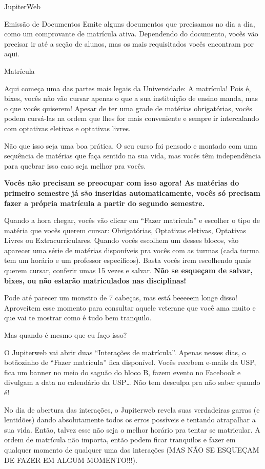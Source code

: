 \begin{secao}{JupiterWeb}
\begin{subsecao}{Emissão de Documentos}
Emite alguns documentos que precisamos no dia a dia, como um comprovante de
matrícula ativa. Dependendo do documento, vocês vão precisar ir até a seção de
alunos, mas os mais requisitados vocês encontram por aqui.

\end{subsecao}

\begin{subsecao}{Matrícula}

Aqui começa uma das partes mais legais da Universidade: A matrícula! Pois é,
bixes, vocês não vão cursar apenas o que a sua instituição de ensino manda, mas o
que vocês quiserem! Apesar de ter uma grade de matérias obrigatórias, vocês
podem cursá-las na ordem que lhes for mais conveniente e sempre ir intercalando
com optativas eletivas e optativas livres.

Não que isso seja uma boa prática. O seu curso foi pensado e montado com uma
sequência de matérias que faça sentido na sua vida, mas vocês têm independência
para quebrar isso caso seja melhor pra vocês.

\textbf{Vocês não precisam se preocupar com isso agora! As matérias do primeiro
semestre já são inseridas automaticamente, vocês só precisam fazer a própria
matrícula a partir do segundo semestre.}

Quando a hora chegar, vocês vão clicar em “Fazer matrícula” e escolher o tipo de
matéria que vocês querem cursar: Obrigatórias, Optativas eletivas, Optativas
Livres ou Extracurriculares. Quando vocês escolhem um desses blocos, vão
aparecer uma série de matérias disponíveis pra vocês com as turmas (cada turma
tem um horário e um professor específicos). Basta vocês irem escolhendo quais
querem cursar, conferir umas 15 vezes e salvar. \textbf{Não se esqueçam de salvar,
bixes, ou não estarão matriculados nas disciplinas!}

Pode até parecer um monstro de 7 cabeças, mas está beeeeem longe disso!
Aproveitem esse momento para consultar aquele veterane que você ama muito e que
vai te mostrar como é tudo bem tranquilo.

Mas quando é mesmo que eu faço isso?

O Jupiterweb vai abrir duas “Interações de matrícula”.
Apenas nesses dias, o botãozinho de “Fazer matrícula” fica disponível. Vocês
recebem e-mails da USP, fica um banner no meio do saguão do bloco B, fazem
evento no Facebook e divulgam a data no calendário da USP… Não tem desculpa pra
não saber quando é!

No dia de abertura das interações, o Jupiterweb revela suas verdadeiras garras
(e lentidões) dando absolutamente todos os erros possíveis e tentando
atrapalhar a sua vida. Então, talvez esse não seja o melhor horário pra tentar
se matricular. A ordem de matrícula não importa, então podem ficar tranquilos e
fazer em qualquer momento de qualquer uma das interações (MAS NÃO SE ESQUEÇAM DE
FAZER EM ALGUM MOMENTO!!!).


\end{subsecao}
\end{secao}
